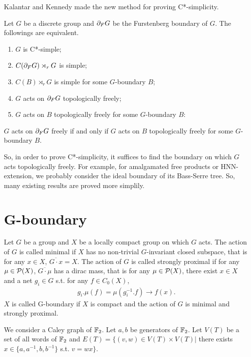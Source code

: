 \documentclass{article}[12pt]
\begin{document}
Kalantar and Kennedy \cite{Kalantar2017boundaries} made the new method for proving C*-simplicity.
\begin{theorem}
  Let $G$ be a discrete group and $\d_FG$ be the Furstenberg boundary of $G$.
  The followings are equivalent.
  \begin{enumerate}
  \item $G$ is C*-simple;
  \item $C(\d_FG) \rtimes_r G$ is simple;
  \item $C(B) \rtimes_r G$ is simple for some $G$-boundary $B$;
  \item $G$ acts on $\d_FG$ topologically freely;
    \item $G$ acts on $B$ topologically freely for some $G$-boundary $B$:
  \end{enumerate}
\end{theorem}

\begin{remark}
  $G$ acts on $\d_F G$ freely if and only if $G$ acts on $B$ topologically freely for some $G$-boundary $B$.
\end{remark}

So, in order to prove C*-simplicity, it suffices to find the boundary on which $G$ acts topologically freely.
For example, for amalgamated free products or HNN-extension, we probably consider the ideal boundary of its Bass-Serre tree.
So, many existing results are proved more simplily.

\section{G-boundary}

\begin{definition}
  Let $G$ be a group and $X$ be a locally compact group on which $G$ acts.
  The action of $G$ is called minimal if $X$ has no non-trivial $G$-invariant closed subspace,
  that is for any $x \in X$, $\overline{G\cdot x} = X$.
  The action of $G$ is called strongly proximal if for any $ \mu \in \P(X)$, $\overline{G\cdot \mu}$ has a dirac mass,
  that is for any $ \mu \in \P(X)$, there exist $x \in X$ and a net $ g_i \in G$ s.t.
  for any $f \in C_0(X)$,
  \begin{align*}
    g_i.\mu(f) = \mu(g_i^{-1}.f) \rightarrow f(x).
  \end{align*}
  $X$ is called G-boundary if $X$ is compact and the action of $G$ is minimal and strongly proximal.
\end{definition}

\begin{example}[$\F_2$]
  We consider a Caley graph of $\F_2$.
  Let $a, b$ be generators of $\F_2$.
  Let $V(T)$ be a set of all words of $\F_2$ and $E(T) = \{ (v,w) \in V(T)\times V(T) |$ there exists $ x \in \{a, a^{-1}, b, b^{-1}\}$ s.t. $v = wx \}$.
\end{example}


\end{document}
